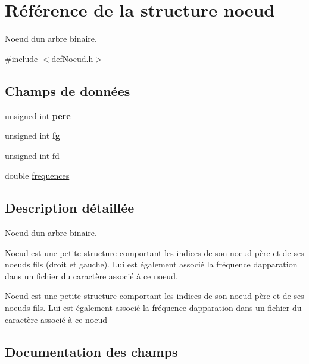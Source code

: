 \hypertarget{structnoeud}{}\section{Référence de la structure noeud}
\label{structnoeud}


Noeud d\textquotesingle{}un arbre binaire.  




{\ttfamily \#include $<$def\+Noeud.\+h$>$}

\subsection*{Champs de données}
\begin{DoxyCompactItemize}
\item 
unsigned int {\bfseries pere}\hypertarget{structnoeud_aa5b03ff1fc332c2390f0324398c0ee1d}{}\label{structnoeud_aa5b03ff1fc332c2390f0324398c0ee1d}

\item 
unsigned int {\bfseries fg}\hypertarget{structnoeud_ae14c26edcd37240fc9f8e3769d55d3e5}{}\label{structnoeud_ae14c26edcd37240fc9f8e3769d55d3e5}

\item 
unsigned int \hyperlink{structnoeud_a72ced58e381fdf4144d295884dcd7168}{fd}
\item 
double \hyperlink{structnoeud_a27b27306f715b45b8f8e47bb35ad3859}{frequences}
\end{DoxyCompactItemize}


\subsection{Description détaillée}
Noeud d\textquotesingle{}un arbre binaire. 

Noeud est une petite structure comportant les indices de son noeud père et de ses noeuds fils (droit et gauche). Lui est également associé la fréquence d\textquotesingle{}apparation dans un fichier du caractère associé à ce noeud.

Noeud est une petite structure comportant les indices de son noeud père et de ses noeuds fils. Lui est également associé la fréquence d\textquotesingle{}apparation dans un fichier du caractère associé à ce noeud 

\subsection{Documentation des champs}
